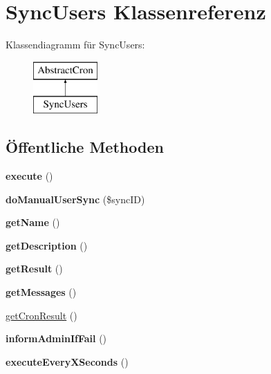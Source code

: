 \hypertarget{class_sync_users}{}\section{Sync\+Users Klassenreferenz}
\label{class_sync_users}
Klassendiagramm für Sync\+Users\+:\begin{figure}[H]
\begin{center}
\leavevmode
\includegraphics[height=2.000000cm]{class_sync_users}
\end{center}
\end{figure}
\subsection*{Öffentliche Methoden}
\begin{DoxyCompactItemize}
\item 
\mbox{\label{class_sync_users_a7abdd530ce5e4c1a6168c6f0d291c983}} 
{\bfseries execute} ()
\item 
\mbox{\label{class_sync_users_a8007af5d0227941d1512067fbd4b4ba7}} 
{\bfseries do\+Manual\+User\+Sync} (\$sync\+ID)
\item 
\mbox{\label{class_sync_users_a099e94079a5b68f2642c564de2544e5a}} 
{\bfseries get\+Name} ()
\item 
\mbox{\label{class_sync_users_ad162c248957f9bbb42fdf52e145ba2ce}} 
{\bfseries get\+Description} ()
\item 
\mbox{\label{class_sync_users_a92e94a3d17a02b2fab5955b1a6235b6a}} 
{\bfseries get\+Result} ()
\item 
\mbox{\label{class_sync_users_a586d685617e047110cb687100c5a2c04}} 
{\bfseries get\+Messages} ()
\item 
\mbox{\hyperlink{class_sync_users_a1206029fdd16729ed8c9bea45ec96442}{get\+Cron\+Result}} ()
\item 
\mbox{\label{class_sync_users_a0d24126523efd03f6c04e526be0af740}} 
{\bfseries inform\+Admin\+If\+Fail} ()
\item 
\mbox{\label{class_sync_users_a77c101cc16f84a105e4547332904985f}} 
{\bfseries execute\+Every\+X\+Seconds} ()
\end{DoxyCompactItemize}


